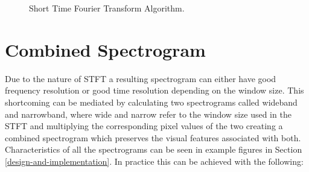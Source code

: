 \documentclass[a4paper,12pt]{report}
\begin{document}
\begin{figure}[htbp]
\begin{center}
\end{center}
\caption[Short Time Fourier Transform Algorithm]{Short Time Fourier Transform Algorithm.}
\label{alg:stft}
\end{figure}
\section{Combined Spectrogram}
\label{combined}
Due to the nature of STFT a resulting spectrogram can either have good frequency resolution or good time resolution depending on the window size. This shortcoming can be mediated by calculating two spectrograms called wideband and narrowband, where wide and narrow refer to the window size used in the STFT and multiplying the corresponding pixel values of the two creating a combined spectrogram \cite{paper:2} which preserves the visual features associated with both. Characteristics of all the spectrograms can be seen in example figures in Section \ref{design-and-implementation}. In practice this can be achieved with the following: 
\end{document}
